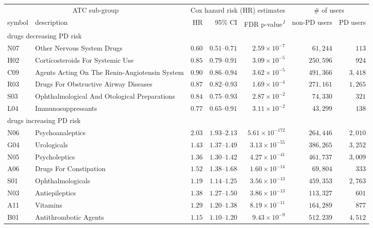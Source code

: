 \setlength{\LTpost}{0mm}
\begin{longtable}{llrrrrr}
\toprule
\multicolumn{2}{c}{ATC sub-group} & \multicolumn{3}{c}{Cox hazard risk (HR) estimates} & \multicolumn{2}{c}{\# of users} \\ 
\cmidrule(lr){1-2} \cmidrule(lr){3-5} \cmidrule(lr){6-7}
symbol & description & HR & 95\% CI & FDR p-value\textsuperscript{\textit{1}} & non-PD users & PD users \\ 
\midrule
\multicolumn{7}{l}{drugs decreasing PD risk} \\ 
\midrule
N07 & Other Nervous System Drugs & $0.60$ & $0.51$–$0.71$ & $2.59 \times 10^{-7}$ & $61,244$ & $113$ \\ 
H02 & Corticosteroids For Systemic Use & $0.85$ & $0.79$–$0.91$ & $3.09 \times 10^{-5}$ & $250,596$ & $924$ \\ 
C09 & Agents Acting On The Renin-Angiotensin System & $0.90$ & $0.86$–$0.94$ & $3.62 \times 10^{-5}$ & $491,366$ & $3,418$ \\ 
R03 & Drugs For Obstructive Airway Diseases & $0.87$ & $0.82$–$0.93$ & $1.69 \times 10^{-4}$ & $271,161$ & $1,265$ \\ 
S03 & Ophthalmological And Otological Preparations & $0.84$ & $0.75$–$0.93$ & $2.87 \times 10^{-2}$ & $74,330$ & $321$ \\ 
L04 & Immunosuppressants & $0.77$ & $0.65$–$0.91$ & $3.11 \times 10^{-2}$ & $43,299$ & $138$ \\ 
\midrule
\multicolumn{7}{l}{drugs increasing PD risk} \\ 
\midrule
N06 & Psychoanaleptics & $2.03$ & $1.93$–$2.13$ & $5.61 \times 10^{-172}$ & $264,446$ & $2,010$ \\ 
G04 & Urologicals & $1.43$ & $1.37$–$1.49$ & $3.13 \times 10^{-55}$ & $386,265$ & $3,252$ \\ 
N05 & Psycholeptics & $1.36$ & $1.30$–$1.42$ & $4.27 \times 10^{-41}$ & $461,737$ & $3,009$ \\ 
A06 & Drugs For Constipation & $1.52$ & $1.38$–$1.68$ & $1.60 \times 10^{-14}$ & $69,804$ & $333$ \\ 
S01 & Ophthalmologicals & $1.19$ & $1.14$–$1.25$ & $3.56 \times 10^{-13}$ & $459,353$ & $2,763$ \\ 
N03 & Antiepileptics & $1.38$ & $1.27$–$1.50$ & $3.86 \times 10^{-13}$ & $113,327$ & $601$ \\ 
A11 & Vitamins & $1.29$ & $1.20$–$1.38$ & $8.19 \times 10^{-11}$ & $164,289$ & $877$ \\ 
B01 & Antithrombotic Agents & $1.15$ & $1.10$–$1.20$ & $9.43 \times 10^{-9}$ & $512,239$ & $4,512$ \\ 

\end{longtable}

